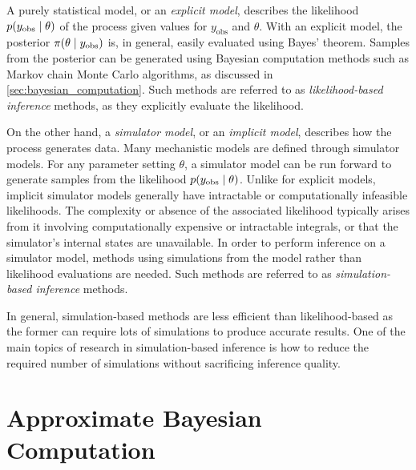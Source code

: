 A purely statistical model, or an \textit{explicit model}, describes the likelihood $p \qty(y_\mathrm{obs} \mid \theta)$ of the process given values for $y_\mathrm{obs}$ and $\theta$. With an explicit model, the posterior $\pi \qty(\theta \mid y_\mathrm{obs})$ is, in general, easily evaluated using Bayes' theorem. Samples from the posterior can be generated using Bayesian computation methods such as Markov chain Monte Carlo algorithms, as discussed in \cref{sec:bayesian_computation}. Such methods are referred to as \textit{likelihood-based inference} methods, as they explicitly evaluate the likelihood.   

On the other hand, a \textit{simulator model}, or an \textit{implicit model}, describes how the process generates data. Many mechanistic models are defined through simulator models. For any parameter setting $\theta$, a simulator model can be run forward to generate samples from the likelihood $p \qty(y_\mathrm{obs} \mid \theta)$. Unlike for explicit models, implicit simulator models generally have intractable or computationally infeasible likelihoods. The complexity or absence of the associated likelihood typically arises from it involving computationally expensive or intractable integrals, or that the simulator's internal states are unavailable. In order to perform inference on a simulator model, methods using simulations from the model rather than likelihood evaluations are needed. Such methods are referred to as \textit{simulation-based inference} methods.

In general, simulation-based methods are less efficient than likelihood-based as the former can require lots of simulations to produce accurate results. One of the main topics of research in simulation-based inference is how to reduce the required number of simulations without sacrificing inference quality.


\section{Approximate Bayesian Computation}\label{sec:abc}


